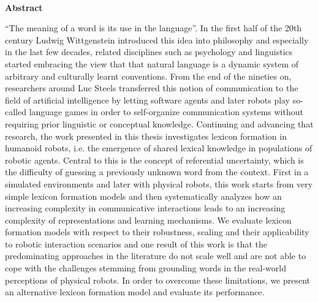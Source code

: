 

~\\



\begin{addmargin}[1.2cm]{1.2cm}
{\Large\sffamily\bfseries Abstract}
\vspace{0.5cm}

\noindent ``The meaning of a word is its use in the language''. In the
first half of the 20th century Ludwig Wittgenstein introduced this
idea into philosophy and especially in the last few decades, related
disciplines such as psychology and linguistics started embracing the
view that that natural language is a dynamic system of arbitrary and
culturally learnt conventions. From the end of the nineties on,
researchers around Luc Steels transferred this notion of communication
to the field of artificial intelligence by letting software agents and
later robots play so-called language games in order to self-organize
communication systems without requiring prior linguistic or conceptual
knowledge. Continuing and advancing that research, the work presented
in this thesis investigates lexicon formation in humanoid robots,
i.e. the emergence of shared lexical knowledge in populations of
robotic agents. Central to this is the concept of referential
uncertainty, which is the difficulty of guessing a previously unknown
word from the context. First in a simulated environments and later
with physical robots, this work starts from very simple lexicon
formation models and then systematically analyzes how an increasing
complexity in communicative interactions leads to an increasing
complexity of representations and learning mechanisms. We evaluate
lexicon formation models with respect to their robustness, scaling and
their applicability to robotic interaction scenarios and one result of
this work is that the predominating approaches in the literature do
not scale well and are not able to cope with the challenges stemming
from grounding words in the real-world perceptions of physical
robots. In order to overcome these limitations, we present an
alternative lexicon formation model and evaluate its performance.
\end{addmargin}

\cleardoublepage




~\\

